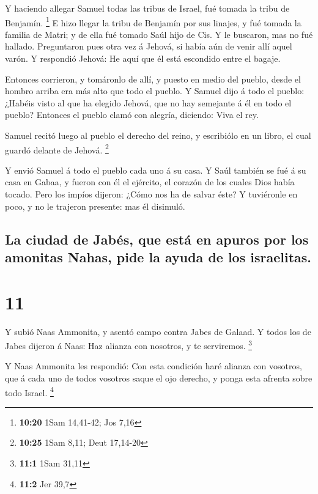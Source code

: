  Y haciendo allegar Samuel todas las tribus de Israel, fué
tomada la tribu de Benjamín. \footnote{\textbf{10:20} 1Sam 14,41-42; Jos
  7,16}  E hizo llegar la tribu de Benjamín por sus
linajes, y fué tomada la familia de Matri; y de ella fué tomado Saúl
hijo de Cis. Y le buscaron, mas no fué hallado. 
Preguntaron pues otra vez á Jehová, si había aún de venir allí aquel
varón. Y respondió Jehová: He aquí que él está escondido entre el
bagaje.

 Entonces corrieron, y tomáronlo de allí, y puesto en medio
del pueblo, desde el hombro arriba era más alto que todo el pueblo.
 Y Samuel dijo á todo el pueblo: ¿Habéis visto al que ha
elegido Jehová, que no hay semejante á él en todo el pueblo? Entonces el
pueblo clamó con alegría, diciendo: Viva el rey.

 Samuel recitó luego al pueblo el derecho del reino, y
escribiólo en un libro, el cual guardó delante de Jehová. \footnote{\textbf{10:25}
  1Sam 8,11; Deut 17,14-20}

 Y envió Samuel á todo el pueblo cada uno á su casa. Y Saúl
también se fué á su casa en Gabaa, y fueron con él el ejército, el
corazón de los cuales Dios había tocado.  Pero los impíos
dijeron: ¿Cómo nos ha de salvar éste? Y tuviéronle en poco, y no le
trajeron presente: mas él disimuló.

\hypertarget{la-ciudad-de-jabuxe9s-que-estuxe1-en-apuros-por-los-amonitas-nahas-pide-la-ayuda-de-los-israelitas.}{%
\subsection{La ciudad de Jabés, que está en apuros por los amonitas
Nahas, pide la ayuda de los
israelitas.}\label{la-ciudad-de-jabuxe9s-que-estuxe1-en-apuros-por-los-amonitas-nahas-pide-la-ayuda-de-los-israelitas.}}

\hypertarget{section-10}{%
\section{11}\label{section-10}}

 Y subió Naas Ammonita, y asentó campo contra Jabes de
Galaad. Y todos los de Jabes dijeron á Naas: Haz alianza con nosotros, y
te serviremos. \footnote{\textbf{11:1} 1Sam 31,11}

 Y Naas Ammonita les respondió: Con esta condición haré
alianza con vosotros, que á cada uno de todos vosotros saque el ojo
derecho, y ponga esta afrenta sobre todo Israel. \footnote{\textbf{11:2}
  Jer 39,7}

